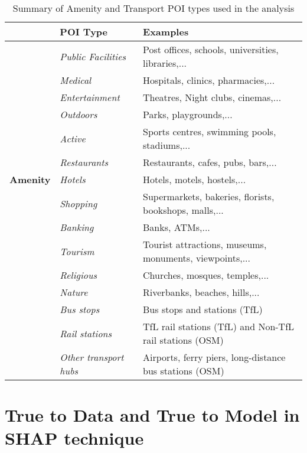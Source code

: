 \begin{table}[ht]
    \centering
    \renewcommand{\arraystretch}{1.1}
    \begin{tabular}{|l|l|l|}
        \hline
        \rowcolor{lightgray}
        & \textbf{POI Type} & \textbf{Examples} \\
        \hline
        \multirow{13}{*}{\textbf{Amenity}}
            &\textit{Public Facilities} & Post offices, schools, universities, libraries,... \\
            &\textit{Medical} & Hospitals, clinics, pharmacies,... \\
            &\textit{Entertainment} & Theatres, Night clubs, cinemas,... \\
            &\textit{Outdoors} & Parks, playgrounds,... \\
            &\textit{Active} & Sports centres, swimming pools, stadiums,... \\
            &\textit{Restaurants} & Restaurants, cafes, pubs, bars,... \\
            &\textit{Hotels} & Hotels, motels, hostels,... \\
            &\textit{Shopping} & Supermarkets, bakeries, florists, bookshops, malls,... \\
            &\textit{Banking} & Banks, ATMs,... \\
            &\textit{Tourism} & Tourist attractions, museums, monuments, viewpoints,... \\
            &\textit{Religious} & Churches, mosques, temples,... \\
            &\textit{Nature} & Riverbanks, beaches, hills,... \\
        \hline
        \multirow{3}{*}{\textbf{Transport}}
            &\textit{Bus stops} & Bus stops and stations (TfL) \\
            &\textit{Rail stations} & TfL rail stations (TfL) and Non-TfL rail stations (OSM) \\
            &\textit{Other transport hubs} & Airports, ferry piers, long-distance bus stations (OSM) \\
        \hline
    \end{tabular}
    \caption{Summary of Amenity and Transport POI types used in the analysis}
    \label{tab:osmpoi}
\end{table}

\section{True to Data and True to Model in SHAP technique}

